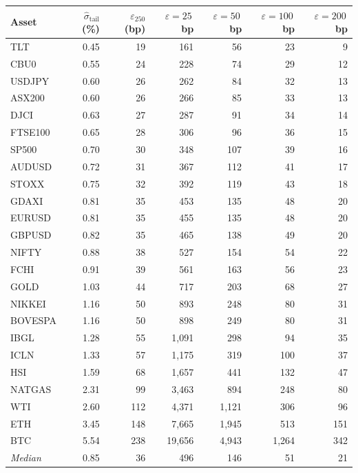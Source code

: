 \begin{tabular}{lrrrrrr}
\toprule
Asset & $\hat{\sigma}_{\mathrm{tail}}$ (\%) & $\varepsilon_{250}$ (bp) & $\varepsilon{=}25\,$bp & $\varepsilon{=}50\,$bp & $\varepsilon{=}100\,$bp & $\varepsilon{=}200\,$bp \\
\midrule
  TLT & 0.45 & 19 & 161 & 56 & 23 & 9 \\
  CBU0 & 0.55 & 24 & 228 & 74 & 29 & 12 \\
  USDJPY & 0.60 & 26 & 262 & 84 & 32 & 13 \\
  ASX200 & 0.60 & 26 & 266 & 85 & 33 & 13 \\
  DJCI & 0.63 & 27 & 287 & 91 & 34 & 14 \\
  FTSE100 & 0.65 & 28 & 306 & 96 & 36 & 15 \\
  SP500 & 0.70 & 30 & 348 & 107 & 39 & 16 \\
  AUDUSD & 0.72 & 31 & 367 & 112 & 41 & 17 \\
  STOXX & 0.75 & 32 & 392 & 119 & 43 & 18 \\
  GDAXI & 0.81 & 35 & 453 & 135 & 48 & 20 \\
  EURUSD & 0.81 & 35 & 455 & 135 & 48 & 20 \\
  GBPUSD & 0.82 & 35 & 465 & 138 & 49 & 20 \\
  NIFTY & 0.88 & 38 & 527 & 154 & 54 & 22 \\
  FCHI & 0.91 & 39 & 561 & 163 & 56 & 23 \\
  GOLD & 1.03 & 44 & 717 & 203 & 68 & 27 \\
  NIKKEI & 1.16 & 50 & 893 & 248 & 80 & 31 \\
  BOVESPA & 1.16 & 50 & 898 & 249 & 80 & 31 \\
  IBGL & 1.28 & 55 & 1{,}091 & 298 & 94 & 35 \\
  ICLN & 1.33 & 57 & 1{,}175 & 319 & 100 & 37 \\
  HSI & 1.59 & 68 & 1{,}657 & 441 & 132 & 47 \\
  NATGAS & 2.31 & 99 & 3{,}463 & 894 & 248 & 80 \\
  WTI & 2.60 & 112 & 4{,}371 & 1{,}121 & 306 & 96 \\
  ETH & 3.45 & 148 & 7{,}665 & 1{,}945 & 513 & 151 \\
  BTC & 5.54 & 238 & 19{,}656 & 4{,}943 & 1{,}264 & 342 \\
\midrule
  \textit{Median} & 0.85 & 36 & 496 & 146 & 51 & 21 \\
\bottomrule
\end{tabular}
